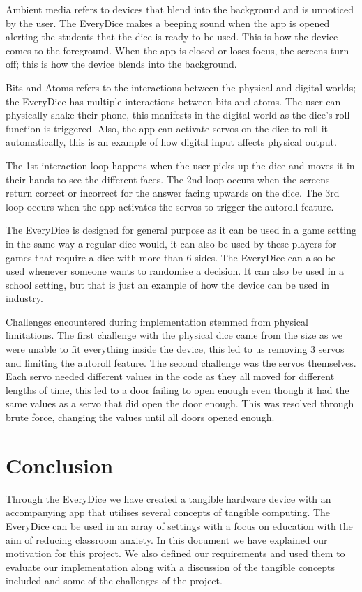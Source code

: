 \documentclass{sigchi}
\begin{document}
Ambient media refers to devices that blend into the background and is unnoticed by the user. The EveryDice makes a beeping sound when the app is opened alerting the students that the dice is ready to be used. This is how the device comes to the foreground. When the app is closed or loses focus, the screens turn off; this is how the device blends into the background. 

Bits and Atoms refers to the interactions between the physical and digital worlds; the EveryDice has multiple interactions between bits and atoms. The user can physically shake their phone, this manifests in the digital world as the dice’s roll function is triggered. Also, the app can activate servos on the dice to roll it automatically, this is an example of how digital input affects physical output. 

The 1st interaction loop happens when the user picks up the dice and moves it in their hands to see the different faces. The 2nd loop occurs when the screens return correct or incorrect for the answer facing upwards on the dice. The 3rd loop occurs when the app activates the servos to trigger the autoroll feature. 

The EveryDice is designed for general purpose as it can be used in a game setting in the same way a regular dice would, it can also be used by these players for games that require a dice with more than 6 sides. The EveryDice can also be used whenever someone wants to randomise a decision. It can also be used in a school setting, but that is just an example of how the device can be used in industry. 

Challenges encountered during implementation stemmed from physical limitations. The first challenge with the physical dice came from the size as we were unable to fit everything inside the device, this led to us removing 3 servos and limiting the autoroll feature. The second challenge was the servos themselves. Each servo needed different values in the code as they all moved for different lengths of time, this led to a door failing to open enough even though it had the same values as a servo that did open the door enough. This was resolved through brute force, changing the values until all doors opened enough. 

\section{Conclusion}
Through the EveryDice we have created a tangible hardware device with an accompanying app that utilises several concepts of tangible computing. The EveryDice can be used in an array of settings with a focus on education with the aim of reducing classroom anxiety. In this document we have explained our motivation for this project. We also defined our requirements and used them to evaluate our implementation along with a discussion of the tangible concepts included and some of the challenges of the project.  
\end{document}
